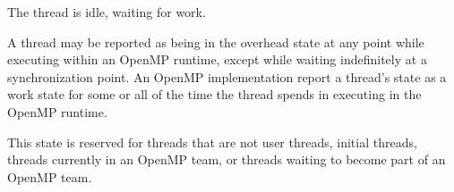 
\begin{description}
\item {} 

  The thread is idle, waiting for work.

\item {} 

  A thread may be reported as being in the overhead state at any point while 
  executing within an OpenMP runtime, except while waiting indefinitely
  at a synchronization point.
  An OpenMP implementation report a thread's state as a work state for
  some or all of the time the thread spends in executing in the OpenMP runtime.

\item {} 

  This state is reserved for threads that are not user threads,
  initial threads, threads currently in an OpenMP team, or threads
  waiting to become part of an OpenMP team.

\end{description}
